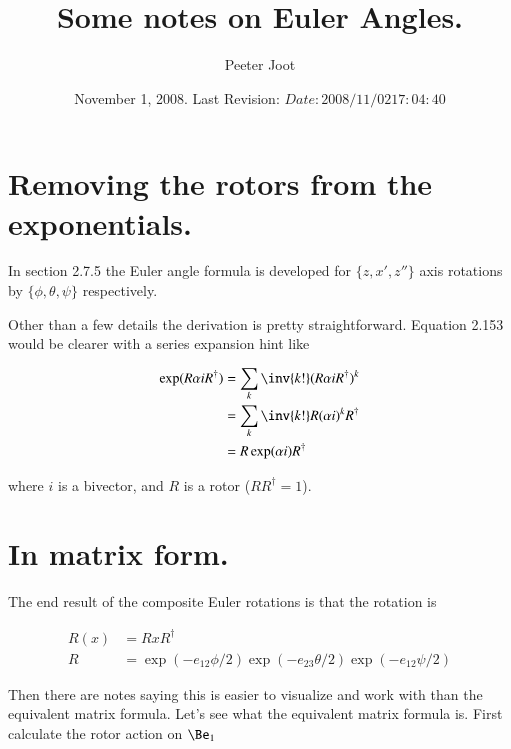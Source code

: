 \documentclass{article}
\title{Some notes on Euler Angles.}
\author{Peeter Joot}
\date{ November 1, 2008. Last Revision: $Date: 2008/11/02 17:04:40 $ }
\begin{document}
\maketitle{}
\tableofcontents

\section{ Removing the rotors from the exponentials. }

In \cite{doran2003gap} section 2.7.5 the Euler angle formula is 
developed for $\{z,x',z''\}$ axis rotations by $\{\phi, \theta, \psi\}$
respectively.

Other than a few details the derivation is pretty straightforward.  Equation
2.153 would be clearer with a series expansion hint like

\begin{align*}
\exp(R \alpha i R^\dagger) 
&= \sum_k \inv{k!} (R \alpha i R^\dagger)^k \\
&= \sum_k \inv{k!} R (\alpha i)^k R^\dagger \\
&= R \exp(\alpha i) R^\dagger
\end{align*}

where $i$ is a bivector, and $R$ is a rotor ($RR^\dagger = 1$).

\section{ In matrix form. }

The end result of the composite Euler rotations is that the rotation is

\begin{align*}
R(x) &= R x R^\dagger \\
R &= \exp(-e_{12}\phi/2) \exp(-e_{23}\theta/2) \exp(-e_{12}\psi/2)
\end{align*}

Then there are notes saying this is easier to visualize and work with than
the equivalent matrix formula.  Let's see what the equivalent matrix formula
is.  First calculate the rotor action on $\Be_1$
\end{document}
